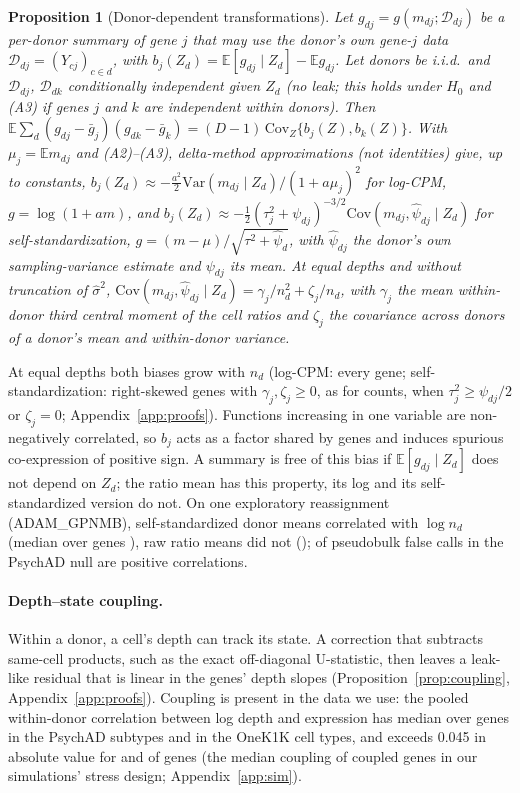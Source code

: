 \documentclass[10pt,letterpaper]{article}
\newtheorem{proposition}{Proposition}
\theoremstyle{definition}
\theoremstyle{remark}
\newcommand{\E}{\mathbb{E}}
\newcommand{\Var}{\mathrm{Var}}
\newcommand{\Cov}{\mathrm{Cov}}
\begin{document}
\begin{proposition}[Donor-dependent transformations]\label{prop:transform}
Let $g_{dj}=g(m_{dj};\mathcal D_{dj})$ be a per-donor summary of gene $j$ that may use the donor's own gene-$j$ data $\mathcal D_{dj}=(Y_{cj})_{c\in d}$, with $b_j(Z_d)=\E[g_{dj}\mid Z_d]-\E g_{dj}$. Let donors be i.i.d.\ and $\mathcal D_{dj}$, $\mathcal D_{dk}$ conditionally independent given $Z_d$ (no leak; this holds under $H_0$ and (A3) if genes $j$ and $k$ are independent within donors). Then $\E\sum_d(g_{dj}-\bar g_j)(g_{dk}-\bar g_k)=(D-1)\,\Cov_Z\{b_j(Z),b_k(Z)\}$. With $\mu_j=\E m_{dj}$ and (A2)--(A3), delta-method approximations (not identities) give, up to constants, $b_j(Z_d)\approx-\tfrac{a^2}{2}\Var(m_{dj}\mid Z_d)/(1+a\mu_j)^2$ for log-CPM, $g=\log(1+am)$, and $b_j(Z_d)\approx-\tfrac12(\tau_j^2+\psi_{dj})^{-3/2}\Cov(m_{dj},\hat\psi_{dj}\mid Z_d)$ for self-standardization, $g=(m-\mu)/\sqrt{\tau^2+\hat\psi_d}$, with $\hat\psi_{dj}$ the donor's own sampling-variance estimate and $\psi_{dj}$ its mean. At equal depths and without truncation of $\hat\sigma^2$, $\Cov(m_{dj},\hat\psi_{dj}\mid Z_d)=\gamma_j/n_d^2+\zeta_j/n_d$, with $\gamma_j$ the mean within-donor third central moment of the cell ratios and $\zeta_j$ the covariance across donors of a donor's mean and within-donor variance.
\end{proposition}

At equal depths both biases grow with $n_d$ (log-CPM: every gene; self-standardization: right-skewed genes with $\gamma_j,\zeta_j\ge0$, as for counts, when $\tau_j^2\ge\psi_{dj}/2$ or $\zeta_j=0$; Appendix~\ref{app:proofs}). Functions increasing in one variable are non-negatively correlated, so $b_j$ acts as a factor shared by genes and induces spurious co-expression of positive sign. A summary is free of this bias if $\E[g_{dj}\mid Z_d]$ does not depend on $Z_d$; the ratio mean has this property, its log and its self-standardized version do not. On one exploratory reassignment (ADAM\_GPNMB), self-standardized donor means correlated with $\log n_d$ (median over genes \Rcorrln{}), raw ratio means did not (\Mcorrln{}); \PBposFrac{} of pseudobulk false calls in the PsychAD null are positive correlations.

\paragraph{Depth--state coupling.} Within a donor, a cell's depth can track its state. A correction that subtracts same-cell products, such as the exact off-diagonal U-statistic, then leaves a leak-like residual that is linear in the genes' depth slopes (Proposition~\ref{prop:coupling}, Appendix~\ref{app:proofs}). Coupling is present in the data we use: the pooled within-donor correlation between log depth and expression has median \CouplingPsy{} over genes in the PsychAD subtypes and \CouplingOnek{} in the OneK1K cell types, and exceeds 0.045 in absolute value for \CouplingPsyFrac{} and \CouplingOnekFrac{} of genes (the median coupling of coupled genes in our simulations' stress design; Appendix~\ref{app:sim}).
\end{document}
